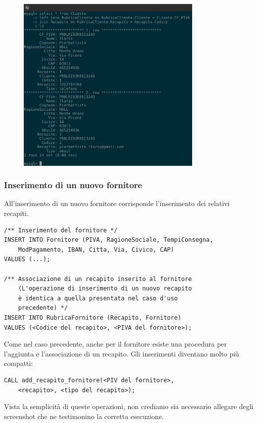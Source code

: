         \begin{figure}[H]
          \centering
          \includegraphics[width=9cm]{images/screenshots/show_cliente_rubrica.png}
        \end{figure}


			\subsubsection{Inserimento di un nuovo fornitore}
				All'inserimento di un nuovo fornitore corrisponde l'inserimento dei relativi recapiti.
				\begin{lstlisting}
/** Inserimento del fornitore */
INSERT INTO Fornitore (PIVA, RagioneSociale, TempiConsegna,
	ModPagamento, IBAN, Citta, Via, Civico, CAP) 
VALUES (...);

/** Associazione di un recapito inserito al fornitore
	(L'operazione di inserimento di un nuovo recapito
	è identica a quella presentata nel caso d'uso 
	precedente) */
INSERT INTO RubricaFornitore (Recapito, Fornitore)
VALUES (<Codice del recapito>, <PIVA del fornitore>);
				\end{lstlisting}

				Come nel caso precedente, anche per il fornitore esiste una procedura per l'aggiunta e l'associazione di un recapito.
				Gli inserimenti diventano molto più compatti:

				\begin{lstlisting}
CALL add_recapito_fornitore(<PIV del fornitore>,
	<recapito>, <tipo del recapito>);
				\end{lstlisting}

        Vista la semplicità di queste operazioni, non crediamo sia necessario allegare degli screenshot che ne testimonino la corretta esecuzione.



